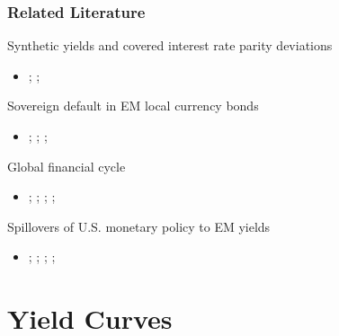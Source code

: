 \documentclass[12pt, aspectratio=169, xcolor=dvipsnames]{beamer}
\begin{document}
\begin{frame}[label=LitReview]
	\frametitle{Related Literature}
	
	\alert{Synthetic yields} and covered interest rate parity deviations
	\begin{itemize}
		\item {\scriptsize \cite{DuSchreger:2016JoF}; \cite*{DuImSchreger:2018JIE}; \cite*{DuTepperVerdelhan:2018}}
	\end{itemize}

	\alert{Sovereign default} in EM local currency bonds
	\begin{itemize}
		\item {\scriptsize \cite{ReinhartRogoff:2011}; \cite{DuSchreger:2016JoF}; \cite{ErceMallucci:2018}; \cite{OttonelloPerez:2019}}
	\end{itemize}
	
	\alert{Global financial cycle}
	\begin{itemize}
		\item {\scriptsize \cite{Rey:2013}; \cite{Turner:2014}; \cite{Obstfeld:2015}; \cite{Kalemli-Ozcan:2019}; \cite{KolasaWesolowski:2020}}
	\end{itemize}
	
	\alert{Spillovers} of U.S. monetary policy to EM yields
	\begin{itemize}
		\item {\scriptsize \cite{HausmanWongswan:2011}; \cite*{BowmanLondonoSapriza:2015}; \cite*{CurcuruKaminLiRodriguez:2018}; \cite*{Albaglietal:2019}; \cite*{ACDM:2019}}
	\end{itemize}
\end{frame}


\section{Yield Curves}
\end{document}
